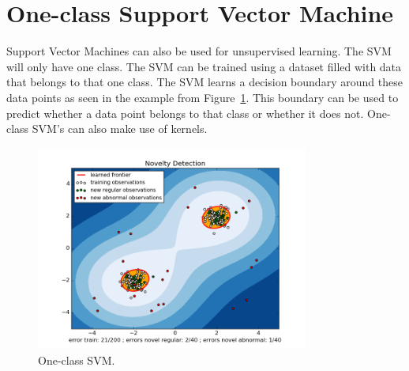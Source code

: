 \section{One-class Support Vector Machine}
\label{oneclassSVM}
Support Vector Machines can also be used for unsupervised learning. The SVM will only have one class. The SVM can be trained using a dataset filled with data that belongs to that one class. The SVM learns a decision boundary around these data points as seen in the example from Figure~\ref{fig:oneclasssvmExample}. This boundary can be used to predict whether a data point belongs to that class or whether it does not. One-class SVM's can also make use of kernels.

\begin{figure}[H]
\centering
\includegraphics[width=0.8\textwidth]{Figures/oneclasssvmExample}
\decoRule
\caption[One-class SVM]{One-class SVM. \cite{oneclasssvmExample}}
\label{fig:oneclasssvmExample}
\end{figure}
 
